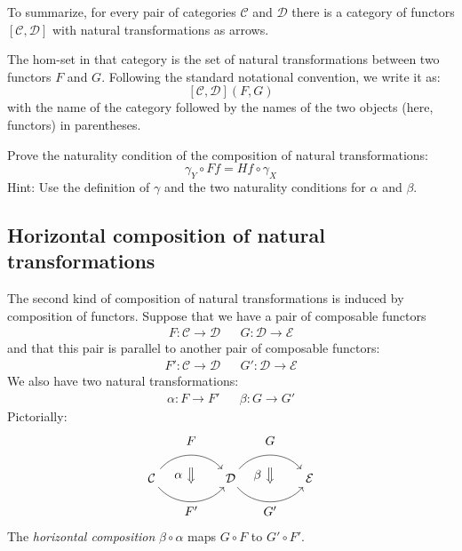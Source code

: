 \documentclass[DaoFP]{subfiles}
\begin{document}
To summarize, for every pair of categories $\mathcal{C}$ and $\mathcal{D}$ there is a category of functors $[\mathcal{C}, \mathcal{D}]$ with natural transformations as arrows. 

The hom-set in that category is the set of natural transformations between two functors $F$ and $G$. Following the standard notational convention, we write it as:
\[ [\mathcal{C}, \mathcal{D}](F, G) \]
with the name of the category followed by the names of the two objects (here, functors) in parentheses.


\begin{exercise}
Prove the naturality condition of the composition of natural transformations:
\[ \gamma_Y \circ F f = H f \circ \gamma_X \]
Hint: Use the definition of $\gamma$ and the two naturality conditions for $\alpha$ and $\beta$.
\end{exercise}

\subsection{Horizontal composition of natural transformations}

The second kind of composition of natural transformations is induced by composition of functors. Suppose that we have a pair of composable functors
\begin{align*}
 F \colon \mathcal{C} \to \mathcal{D}
&&G \colon \mathcal{D} \to \mathcal{E} 
\end{align*}
and that this pair is parallel to another pair of composable functors:
\begin{align*}
 F' \colon \mathcal{C} \to \mathcal{D}
&& G' \colon \mathcal{D} \to \mathcal{E} 
\end{align*}
We also have two natural transformations:
\begin{align*}
\alpha \colon F \to F'  
&& \beta \colon G \to G' 
\end{align*}
Pictorially:
\[
\begin{tikzcd}[column sep=huge]
\mathcal{C}
  \arrow[bend left=50]{r}[name=U, label=above:$F$]{}
  \arrow[bend right=50]{r}[name=D, label=below:$F'$]{} 
 &
\mathcal{D}
  \arrow[bend left=50]{r}[name=U1, label=above:$G$]{}
  \arrow[bend right=50]{r}[name=D1, label=below:$G'$]{} 
 &
\mathcal{E}
  \arrow[shorten <=10pt,shorten >=10pt,Rightarrow,to path={(U) -- node[label=left:$\alpha$] {} (D)}]{}
  \arrow[shorten <=10pt,shorten >=10pt,Rightarrow,to path={(U1) -- node[label=left:$\beta$] {} (D1)}]{}
\end{tikzcd}
\]
The \emph{horizontal composition} $\beta \circ \alpha$ maps $G \circ F$ to $G' \circ F'$.
\end{document}
